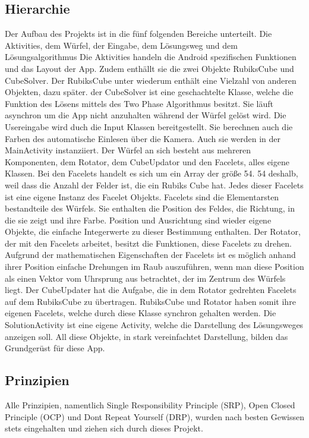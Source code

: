 \subsection{Hierarchie}  %
Der Aufbau des Projekts ist in die fünf folgenden Bereiche unterteilt. Die
Aktivities, dem Würfel, der Eingabe, dem Lösungsweg und dem Lösungsalgorithmus
Die Aktivities handeln die Android spezifischen Funktionen und das Layout der
App. Zudem enthällt sie die zwei Objekte RubiksCube und CubeSolver. Der RubiksCube
unter wiederum enthält eine Vielzahl von anderen Objekten, dazu später. der
CubeSolver ist eine geschachtelte Klasse, welche die Funktion des Lösens mittels
des Two Phase Algorithmus besitzt. Sie läuft asynchron um die App nicht anzuhalten
während der Würfel gelöst wird.
Die Usereingabe wird duch die Input Klassen bereitgestellt. Sie berechnen auch
die Farben des automatische Einlesen über die Kamera. Auch sie werden in der
MainActivity instanziiert.
Der Würfel an sich besteht aus mehreren Komponenten, dem Rotator, dem CubeUpdator
und den Facelets, alles eigene Klassen. Bei den Facelets handelt es sich um ein
Array der größe 54. 54 deshalb, weil dass die Anzahl der Felder ist, die ein
Rubiks Cube hat. Jedes dieser Facelets ist eine eigene Instanz des Facelet Objekts.
Facelets sind die Elementarsten bestandteile des Würfels. Sie enthalten die
Position des Feldes, die Richtung, in die sie zeigt und ihre Farbe. Position und
Ausrichtung sind wieder eigene Objekte, die einfache Integerwerte zu dieser
Bestimmung enthalten.
Der Rotator, der mit den Facelets arbeitet, besitzt die Funktionen, diese Facelets
zu drehen. Aufgrund der mathematischen Eigenschaften der Facelets ist es möglich
anhand ihrer Position einfache Drehungen im Raub auszuführen, wenn man diese
Position als einen Vektor vom Uhrsprung aus betrachtet, der im Zentrum des Würfels
liegt.
Der CubeUpdater hat die Aufgabe, die in dem Rotator gedrehten Facelets auf dem
RubiksCube zu übertragen. RubiksCube und Rotator haben somit ihre eigenen Facelets,
welche durch diese Klasse synchron gehalten werden.
Die SolutionActivity ist eine eigene Activity, welche die Darstellung des
Lösungsweges anzeigen soll.
All diese Objekte, in stark vereinfachtet Darstellung, bilden das Grundgerüst
für diese App.

\subsection{Prinzipien}  %
Alle Prinzipien, namentlich Single Responsibility Principle (SRP), Open Closed
Principle (OCP) und Dont Repeat Yourself (DRP), wurden nach besten Gewissen stets
eingehalten und ziehen sich durch dieses Projekt.

